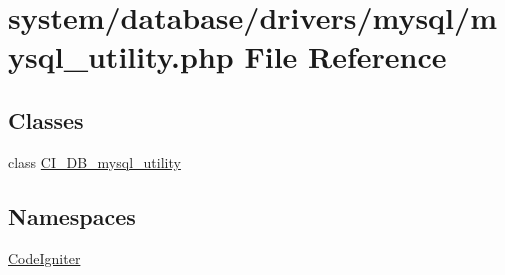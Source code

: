 \hypertarget{mysql__utility_8php}{}\section{system/database/drivers/mysql/mysql\+\_\+utility.php File Reference}
\label{mysql__utility_8php}
\subsection*{Classes}
\begin{DoxyCompactItemize}
\item 
class \mbox{\hyperlink{class_c_i___d_b__mysql__utility}{C\+I\+\_\+\+D\+B\+\_\+mysql\+\_\+utility}}
\end{DoxyCompactItemize}
\subsection*{Namespaces}
\begin{DoxyCompactItemize}
\item 
 \mbox{\hyperlink{namespace_code_igniter}{Code\+Igniter}}
\end{DoxyCompactItemize}
